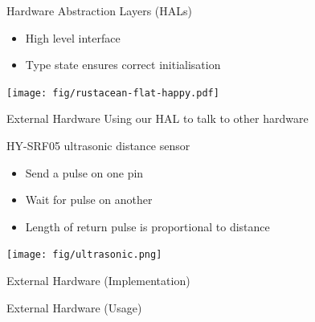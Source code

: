 \documentclass[aspectratio=169]{beamer}
\begin{document}
\begin{frame}{Hardware Abstraction Layers (HALs)}
    \begin{itemize}
        \item{High level interface}
        \item{Type state ensures correct initialisation}
    \end{itemize}
    \hspace*{5cm}\texttt{[image: fig/rustacean-flat-happy.pdf]}
\end{frame}


\begin{frame}{External Hardware}
    Using our HAL to talk to other hardware

    HY-SRF05 ultrasonic distance sensor

    \begin{itemize}
        \item Send a pulse on one pin
        \item Wait for pulse on another
        \item Length of return pulse is proportional to distance
    \end{itemize}

    \hspace*{5cm}\texttt{[image: fig/ultrasonic.png]}
\end{frame}

\begin{frame}{External Hardware (Implementation)}
    \vspace{-0.5cm}
    \begin{linehighlight}{
    }
        
    \end{linehighlight}
\end{frame}

\begin{frame}{External Hardware (Usage)}
    \begin{linehighlight}{
    }
        
    \end{linehighlight}
\end{frame}
\end{document}
